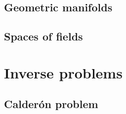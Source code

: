 \documentclass[12pt]{report}
\begin{document}
\section{Geometric manifolds}
\label{sec:geometric_manifolds}


\section{Spaces of fields}
\label{sec:spaces_of_fields}


%


\newpage



\chapter{Inverse problems}

\section{Calder\'on problem}
\label{sec:calderon_problem}


%


\end{document}
